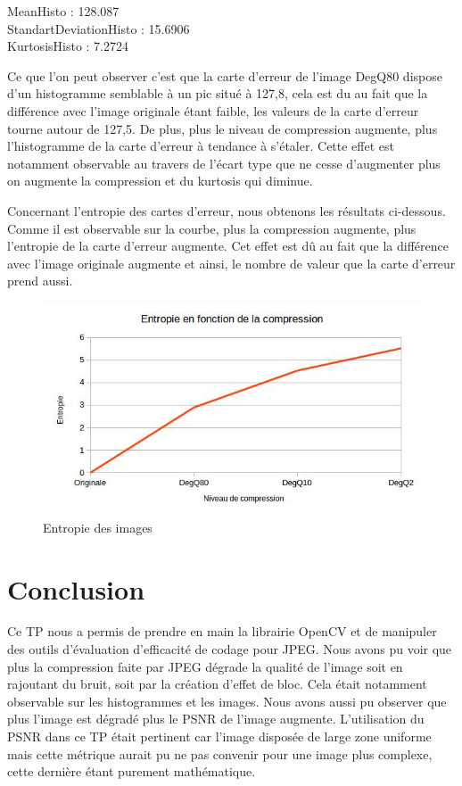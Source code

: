 \documentclass[12pt]{report}
\begin{document}
\begin{center}
MeanHisto : 128.087\\
StandartDeviationHisto : 15.6906\\
KurtosisHisto : 7.2724
\end{center}

Ce que l'on peut observer c'est que la carte d'erreur de l'image DegQ80 dispose d'un histogramme semblable à un pic situé à 127,8, cela est du au fait que la différence avec l'image originale étant faible, les valeurs de la carte d'erreur tourne autour de 127,5. De plus, plus le niveau de compression augmente, plus l'histogramme de la carte d'erreur à tendance à s'étaler. Cette effet est notamment observable au travers de l'écart type que ne cesse d'augmenter plus on augmente la compression et du kurtosis qui diminue.

\newpage
Concernant l'entropie des cartes d'erreur, nous obtenons les résultats ci-dessous. Comme il est observable sur la courbe, plus la compression augmente, plus l'entropie de la carte d'erreur augmente. Cet effet est dû au fait que la différence avec l'image originale augmente et ainsi, le nombre de valeur que la carte d'erreur prend aussi.

\begin{figure}[H]
\begin{center}
\includegraphics[scale=0.8]{../ImageRes/entropie_erreur.jpg} 
\caption{Entropie des images}
\end{center}
\end{figure}

\section{Conclusion}

Ce TP nous a permis de prendre en main la librairie OpenCV et de manipuler des outils d'évaluation d’efficacité de codage pour JPEG. Nous avons pu voir que plus la compression faite par JPEG dégrade la qualité de l'image soit en rajoutant du bruit, soit par la création d'effet de bloc. Cela était notamment observable sur les histogrammes et les images. Nous avons aussi pu observer que plus l'image est dégradé plus le PSNR de l'image augmente. L'utilisation du PSNR dans ce TP était  pertinent car l'image disposée de large zone uniforme mais cette métrique aurait pu ne pas convenir pour une image plus complexe, cette dernière étant purement mathématique.
\end{document}
